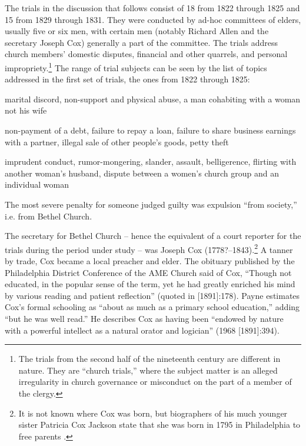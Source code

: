 \documentclass[output=paper,colorlinks,citecolor=brown]{langscibook}
\begin{document}
The trials in the discussion that follows consist of 18 from 1822 through 1825 and 15 from 1829 through 1831. They were conducted by ad-hoc committees of elders, usually five or six men, with certain men (notably Richard Allen and the secretary Joseph Cox) generally a part of the committee. The trials address church members’ domestic disputes, financial and other quarrels, and personal impropriety.\footnote{{The trials from the second half of the nineteenth century are different in nature. They are “church trials,” where the subject matter is an alleged irregularity in church governance or misconduct on the part of a member of the clergy.}} The range of trial subjects can be seen by the list of topics addressed in the first set of trials, the ones from 1822 through 1825:


\begin{description}\sloppy
\item [Domestic:] marital discord, non-support and physical abuse, a man cohabiting with a woman not his wife
 
\item [Financial:] non-payment of a debt, failure to repay a loan, failure to share business earnings with a partner, illegal sale of other people’s goods, petty theft
 
\item [Personal impropriety:] imprudent conduct, rumor-mongering, slander, assault, belligerence, flirting with another woman’s husband, dispute between a women’s church group and an individual woman      
\end{description}

The most severe penalty for someone judged guilty was expulsion “from society,” i.e. from Bethel Church.

The secretary for Bethel Church -- hence the equivalent of a court reporter for the trials during the period under study -- was Joseph Cox (1778?--1843).\footnote{It is not known where Cox was born, but biographers of his much younger sister Patricia Cox Jackson state that she was born in 1795 in Philadelphia to free parents \citep[60]{Schroeder2007}.} A tanner by trade, Cox became a local preacher and elder. The obituary published by the Philadelphia District Conference of the AME Church said of Cox, “Though not educated, in the popular sense of the term, yet he had greatly enriched his mind by various reading and patient reflection” (quoted in \citealt{Payne1968} [1891]:178). Payne estimates Cox’s formal schooling as “about as much as a primary school education,” adding “but he was well read.” He describes Cox as having been “endowed by nature with a powerful intellect as a natural orator and logician” (1968 [1891]:394).
\end{document}
